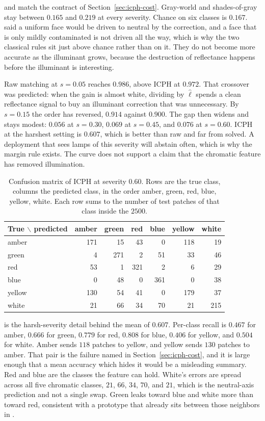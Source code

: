  and  match the contract of Section~\ref{sec:icph-cost}. Gray-world and shades-of-gray stay between $0.165$ and $0.219$ at every severity. Chance on six classes is $0.167$.  said a uniform face would be driven to neutral by the correction, and a face that is only mildly contaminated is not driven all the way, which is why the two classical rules sit just above chance rather than on it. They do not become more accurate as the illuminant grows, because the destruction of reflectance happens before the illuminant is interesting.

Raw matching at $s=0.05$ reaches $0.986$, above ICPH at $0.972$. That crossover was predicted: when the gain is almost white, dividing by $\hat{\ell}$ spends a clean reflectance signal to buy an illuminant correction that was unnecessary. By $s=0.15$ the order has reversed, $0.914$ against $0.900$. The gap then widens and stays modest: $0.056$ at $s=0.30$, $0.069$ at $s=0.45$, and $0.076$ at $s=0.60$. ICPH at the harshest setting is $0.607$, which is better than raw and far from solved. A deployment that sees lamps of this severity will abstain often, which is why the margin rule exists. The curve does not support a claim that the chromatic feature has removed illumination.

\begin{table}[t]
\centering
\caption{Confusion matrix of ICPH at severity $0.60$. Rows are the true class, columns the predicted class, in the order amber, green, red, blue, yellow, white. Each row sums to the number of test patches of that class inside the $2500$.}
\label{tab:confusion}
\small
\begin{tabular}{@{}lrrrrrr@{}}
\toprule
True $\backslash$ predicted & amber & green & red & blue & yellow & white \\
\midrule
amber  & 171 & 15 & 43 & 0 & 118 & 19 \\
green  & 4 & 271 & 2 & 51 & 33 & 46 \\
red    & 53 & 1 & 321 & 2 & 6 & 29 \\
blue   & 0 & 48 & 0 & 361 & 0 & 38 \\
yellow & 130 & 54 & 41 & 0 & 179 & 37 \\
white  & 21 & 66 & 34 & 70 & 21 & 215 \\
\bottomrule
\end{tabular}
\end{table}

 is the harsh-severity detail behind the mean of $0.607$. Per-class recall is $0.467$ for amber, $0.666$ for green, $0.779$ for red, $0.808$ for blue, $0.406$ for yellow, and $0.504$ for white. Amber sends $118$ patches to yellow, and yellow sends $130$ patches to amber. That pair is the failure named in Section~\ref{sec:icph-cost}, and it is large enough that a mean accuracy which hides it would be a misleading summary. Red and blue are the classes the feature can hold. White's errors are spread across all five chromatic classes, $21$, $66$, $34$, $70$, and $21$, which is the neutral-axis prediction and not a single swap. Green leaks toward blue and white more than toward red, consistent with a prototype that already sits between those neighbors in .

